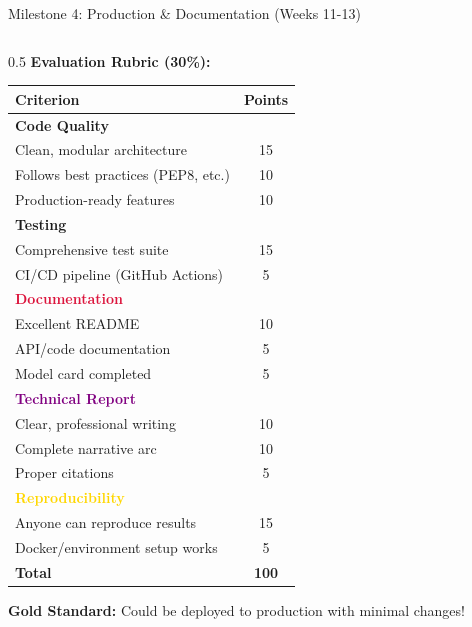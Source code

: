 \begin{frame}{Milestone 4: Production \& Documentation (Weeks 11-13)}
\begin{columns}
\begin{column}{0.5\textwidth}
\textbf{Evaluation Rubric (30\%):}

\begin{table}
\tiny
\begin{tabular}{|l|c|}
\hline
\rowcolor{navyblue!20}
\textbf{Criterion} & \textbf{Points} \\
\hline
\textcolor{forest}{\textbf{Code Quality}} & \\
\hline
Clean, modular architecture & 15 \\
Follows best practices (PEP8, etc.) & 10 \\
Production-ready features & 10 \\
\hline
\textcolor{navyblue}{\textbf{Testing}} & \\
\hline
Comprehensive test suite & 15 \\
CI/CD pipeline (GitHub Actions) & 5 \\
\hline
\textcolor{crimson}{\textbf{Documentation}} & \\
\hline
Excellent README & 10 \\
API/code documentation & 5 \\
Model card completed & 5 \\
\hline
\textcolor{purple}{\textbf{Technical Report}} & \\
\hline
Clear, professional writing & 10 \\
Complete narrative arc & 10 \\
Proper citations & 5 \\
\hline
\textcolor{gold}{\textbf{Reproducibility}} & \\
\hline
Anyone can reproduce results & 15 \\
Docker/environment setup works & 5 \\
\hline
\textbf{Total} & \textbf{100} \\
\hline
\end{tabular}
\end{table}

\vspace{0.2cm}

\textbf{Gold Standard:} Could be deployed to production with minimal changes!
\end{column}
\end{columns}
\end{frame}


